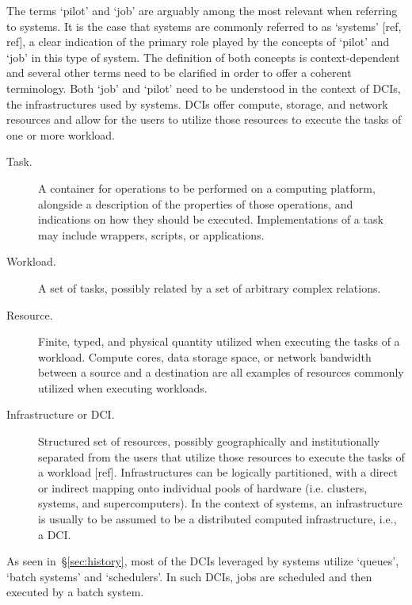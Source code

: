 \documentclass{sig-alternate}
\begin{document}
The terms `pilot' and `job' are arguably among the most relevant when referring
to \pilot systems. It is the case that \pilot systems are commonly referred to
as `\pilotjob systems' [ref, ref], a clear indication of the primary role
played by the concepts of `pilot' and `job' in this type of system. The
definition of both concepts is context-dependent and several other terms need
to be clarified in order to offer a coherent terminology. Both `job' and
`pilot' need to be understood in the context of DCIs, the infrastructures used
by \pilot systems. DCIs offer compute, storage, and network resources and
\pilot allow for the users to utilize those resources to execute the tasks of
one or more workload.

\begin{description}

\item[Task.] A container for operations to be performed on a computing
platform, alongside a description of the properties of those operations, and
indications on how they should be executed. Implementations of a task may
include wrappers, scripts, or applications.

\item[Workload.] A set of tasks, possibly related by a set of arbitrary complex
relations.

\item[Resource.] Finite, typed, and physical quantity utilized when executing
the tasks of a workload. Compute cores, data storage space, or network
bandwidth between a source and a destination are all examples of resources
commonly utilized when executing workloads.

\item[Infrastructure or DCI.] Structured set of resources, possibly
geographically and institutionally separated from the users that utilize those
resources to execute the tasks of a workload [ref]. Infrastructures can be
logically partitioned, with a direct or indirect mapping onto individual pools
of hardware (i.e. clusters, systems, and supercomputers). In the context of
\pilot systems, an infrastructure is usually to be assumed to be a distributed
computed infrastructure, i.e., a DCI.

\end{description}

As seen in~\S\ref{sec:history}, most of the DCIs leveraged by \pilot systems
utilize `queues', `batch systems' and `schedulers'. In such DCIs, jobs are
scheduled and then executed by a batch system.
\end{document}
